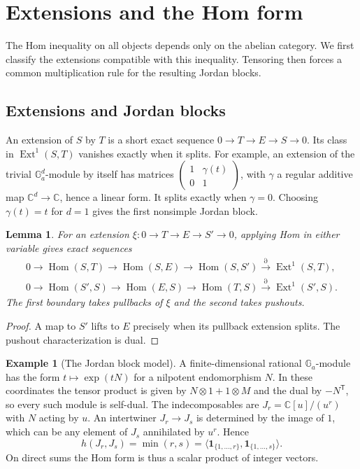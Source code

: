 \documentclass[11pt,reqno]{amsart}
\newtheorem{lemma}[theorem]{Lemma}
\theoremstyle{definition}
\newtheorem{example}[theorem]{Example}
\newcommand{\Hom}{\operatorname{Hom}}
\newcommand{\Ext}{\operatorname{Ext}}
\newcommand{\CC}{\mathbb C}
\newcommand{\Ga}{\mathbb G_a}
\begin{document}
\section{Extensions and the Hom form}\label{sec:global}

The Hom inequality on all objects depends only on the abelian category. We first classify the extensions compatible with this inequality. Tensoring then forces a common multiplication rule for the resulting Jordan blocks.

\subsection{Extensions and Jordan blocks}\label{sec:ext}
An extension of $S$ by $T$ is a short exact sequence
$0\to T\to E\to S\to0$. Its class in $\Ext^1(S,T)$ vanishes exactly
when it splits. For example, an extension of the trivial $\Ga^d$-module by itself has matrices $\left(\begin{smallmatrix}1&\gamma(t)\\0&1\end{smallmatrix}\right)$, with $\gamma$ a regular additive map $\CC^d\to\CC$, hence a linear form. It splits exactly when $\gamma=0$. Choosing $\gamma(t)=t$ for $d=1$ gives the first nonsimple Jordan block.

\begin{lemma}\label{lem:les}
For an extension $\xi\colon0\to T\to E\to S'\to0$, applying Hom in
either variable gives exact sequences
\begin{align*}
 0\to\Hom(S,T)\to\Hom(S,E)\to\Hom(S,S')\xrightarrow{\partial}\Ext^1(S,T),\\
 0\to\Hom(S',S)\to\Hom(E,S)\to\Hom(T,S)\xrightarrow{\partial}\Ext^1(S',S).
\end{align*}
The first boundary takes pullbacks of $\xi$ and the second takes pushouts.
\end{lemma}
\begin{proof}
A map to $S'$ lifts to $E$ precisely when its pullback extension splits.
The pushout characterization is dual.
\end{proof}

\begin{example}[The Jordan block model]\label{thm:min}
A finite-dimensional rational $\Ga$-module has the form
$t\mapsto\exp(tN)$ for a nilpotent endomorphism $N$. In these coordinates
the tensor product is given by $N\otimes1+1\otimes M$ and the dual by
$-N^{\mathsf T}$, so every such module is self-dual. The indecomposables are
$J_r=\CC[u]/(u^r)$ with $N$ acting by $u$. An intertwiner $J_r\to J_s$
is determined by the image of $1$, which can be any element of $J_s$
annihilated by $u^r$. Hence
\[
 h(J_r,J_s)=\min(r,s)
 =\langle\mathbf1_{\{1,\ldots,r\}},\mathbf1_{\{1,\ldots,s\}}\rangle.
\]
On direct sums the Hom form is thus a scalar product of integer vectors.

\end{example}
\end{document}
